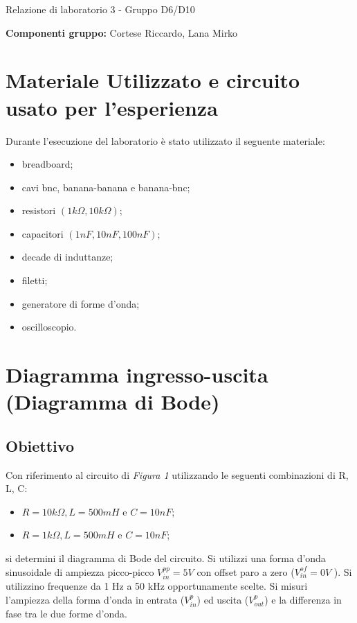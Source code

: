 \documentclass{article}
\begin{document}
\justifying

\begin{center}
    {\fontsize{36}{43.2}\selectfont Relazione di laboratorio 3 - Gruppo D6/D10}
\end{center}
\noindent
\textbf{Componenti gruppo:} Cortese Riccardo, Lana Mirko

\section*{Materiale Utilizzato e circuito usato per l'esperienza}

Durante l'esecuzione del laboratorio è stato utilizzato il seguente materiale:
\begin{itemize}
    \item breadboard;
    \item cavi bnc, banana-banana e banana-bnc;
    \item resistori \((1k\Omega, 10k\Omega)\);
    \item capacitori \((1nF, 10nF, 100nF)\);
    \item decade di induttanze;
    \item filetti;
    \item generatore di forme d'onda;
    \item oscilloscopio.
\end{itemize}



\section{Diagramma ingresso-uscita (Diagramma di Bode)}

\subsection{Obiettivo}
Con riferimento al circuito di \textit{Figura 1} utilizzando le seguenti combinazioni di R, L, C:
\begin{itemize}
    \item $R = 10 k\Omega, L = 500 mH$ e $C = 10 nF$;
    \item $R = 1 k\Omega, L = 500 mH$ e $C = 10 nF$;
\end{itemize}

si determini il diagramma di Bode del circuito. Si utilizzi una forma d'onda sinusoidale di ampiezza picco-picco $V_{in}^{pp} = 5 V$ con offset paro a zero ($V_{in}^{of} = 0 V$ ). Si utilizzino frequenze da 1 Hz a 50 kHz opportunamente scelte. Si misuri l'ampiezza della forma d'onda in entrata ($V_{in}^{p}$) ed uscita ($V_{out}^{p}$) e la differenza in fase tra le due forme d'onda. 
\end{document}
